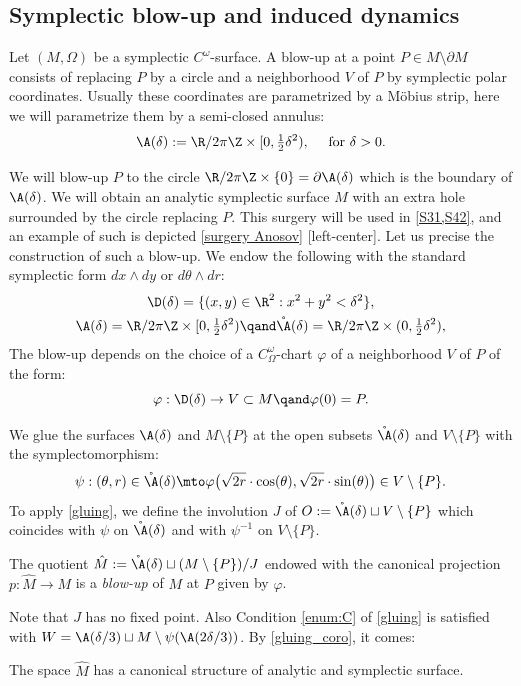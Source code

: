 \subsection{Symplectic blow-up and induced dynamics}\label{S24}
Let $(M,\Omega)$ be a symplectic $C^\omega$\nobreakdash-sur\-face.
A blow-up at a point $P\in M\setminus \partial M$
consists of replacing $P$ by a circle and a neighborhood $V$ of $P$ by symplectic polar coordinates. Usually these coordinates are parametrized by a Möbius strip, here we will parametrize them by a semi-closed annulus:
\[\A(\delta):= \R/2\pi \Z \times [0, \tfrac12 \delta^2), \quad \text{ for } \delta>0.\]

We will blow-up $P$ to the circle $ \R/2\pi \Z \times \{0\}=\partial \A(\delta)$ which is the boundary of $\A(\delta)$. We will obtain an analytic symplectic surface $\hat M$ with an extra hole surrounded by the circle replacing $P$.
This surgery will be used in \cref{S31,S42}, and an example of such is depicted \cref{surgery Anosov} [left-center].
Let us precise the construction of such a blow-up. We endow the following with the standard symplectic form $dx\wedge dy$ or $d\theta\wedge dr$:
\begin{gather*}
\D(\delta)=\{(x,y)\in \R^2: x^2+y^2< \delta^2\},\\
\A(\delta)= \R/2\pi \Z \times [0, \tfrac12 \delta^2)\qand
\mathring \A(\delta)= \R/2\pi \Z \times (0, \tfrac12 \delta^2),\end{gather*}
The blow-up depends on the choice of a $C^\omega_\Omega$-chart $\varphi$ of a neighborhood $V$ of $P$ of the form:
\[\varphi: \D(\delta)\to V \subset M \qand \varphi(0)=P.\]

We glue the surfaces $\A(\delta)$ and
$M\setminus \{P\}$ at the open subsets $\mathring\A(\delta) $ and $V \setminus \{P\}$ with
the symplectomorphism:
\begin{equation} \label{eq psi}\psi: (\theta,r)\in\mathring\A(\delta) \mto \varphi\bigl(\sqrt{2r } \cdot \cos (\theta), \sqrt{2r }\cdot \sin (\theta)\bigr)\in V \setminus \{P\}.\end{equation}
To apply \cref{gluing}, we define the involution $J$ of $O:=\mathring\A(\delta)\sqcup
V \setminus \{P\}$ which coincides with $\psi$ on $\mathring\A(\delta)$ and with $\psi^{-1}$ on $V \setminus \{P\}$.

\begin{definition}\label{def blow-up}
The quotient $ \hat M:=\mathring\A(\delta) \sqcup (M\setminus \{P\}) /J$ endowed with the canonical projection $p:\hat M\to M$ is a \emph{blow-up} of $M$ at $P$ given by $\varphi$. \end{definition}
Note that $J$ has no fixed point. Also Condition \eqref{enum:C} of \cref{gluing} is satisfied
with $W= \A(\delta/3)\sqcup M\setminus \psi (\A(2\delta/3))$. By \cref{gluing_coro}, it comes:
\begin{proposition}\label{prop blow-up} The space $\hat M$ has a
canonical structure of analytic and symplectic surface.
\end{proposition}

